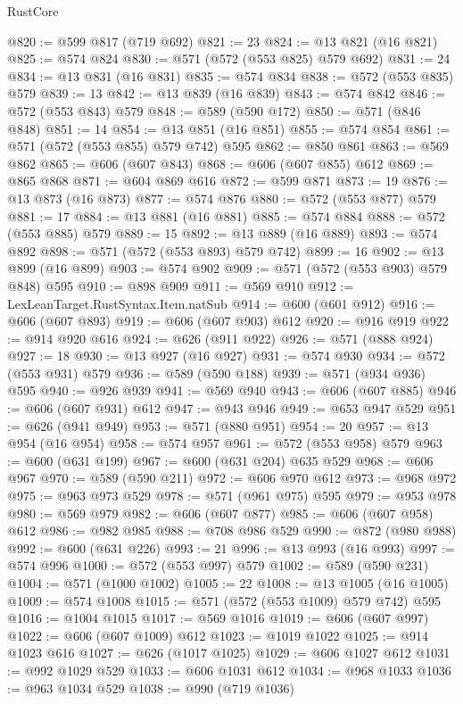 \begin{lexlean}{RustCore}
\begin{coremodule}
@820 := @599 @817 (@719 @692)
@821 := 23
@824 := @13 @821 (@16 @821)
@825 := @574 @824
@830 := @571 (@572 (@553 @825) @579 @692)
@831 := 24
@834 := @13 @831 (@16 @831)
@835 := @574 @834
@838 := @572 (@553 @835) @579
@839 := 13
@842 := @13 @839 (@16 @839)
@843 := @574 @842
@846 := @572 (@553 @843) @579
@848 := @589 (@590 @172)
@850 := @571 (@846 @848)
@851 := 14
@854 := @13 @851 (@16 @851)
@855 := @574 @854
@861 := @571 (@572 (@553 @855) @579 @742) @595
@862 := @850 @861
@863 := @569 @862
@865 := @606 (@607 @843)
@868 := @606 (@607 @855) @612
@869 := @865 @868
@871 := @604 @869 @616
@872 := @599 @871
@873 := 19
@876 := @13 @873 (@16 @873)
@877 := @574 @876
@880 := @572 (@553 @877) @579
@881 := 17
@884 := @13 @881 (@16 @881)
@885 := @574 @884
@888 := @572 (@553 @885) @579
@889 := 15
@892 := @13 @889 (@16 @889)
@893 := @574 @892
@898 := @571 (@572 (@553 @893) @579 @742)
@899 := 16
@902 := @13 @899 (@16 @899)
@903 := @574 @902
@909 := @571 (@572 (@553 @903) @579 @848) @595
@910 := @898 @909
@911 := @569 @910
@912 := LexLeanTarget.RustSyntax.Item.natSub
@914 := @600 (@601 @912)
@916 := @606 (@607 @893)
@919 := @606 (@607 @903) @612
@920 := @916 @919
@922 := @914 @920 @616
@924 := @626 (@911 @922)
@926 := @571 (@888 @924)
@927 := 18
@930 := @13 @927 (@16 @927)
@931 := @574 @930
@934 := @572 (@553 @931) @579
@936 := @589 (@590 @188)
@939 := @571 (@934 @936) @595
@940 := @926 @939
@941 := @569 @940
@943 := @606 (@607 @885)
@946 := @606 (@607 @931) @612
@947 := @943 @946
@949 := @653 @947 @529
@951 := @626 (@941 @949)
@953 := @571 (@880 @951)
@954 := 20
@957 := @13 @954 (@16 @954)
@958 := @574 @957
@961 := @572 (@553 @958) @579
@963 := @600 (@631 @199)
@967 := @600 (@631 @204) @635 @529
@968 := @606 @967
@970 := @589 (@590 @211)
@972 := @606 @970 @612
@973 := @968 @972
@975 := @963 @973 @529
@978 := @571 (@961 @975) @595
@979 := @953 @978
@980 := @569 @979
@982 := @606 (@607 @877)
@985 := @606 (@607 @958) @612
@986 := @982 @985
@988 := @708 @986 @529
@990 := @872 (@980 @988)
@992 := @600 (@631 @226)
@993 := 21
@996 := @13 @993 (@16 @993)
@997 := @574 @996
@1000 := @572 (@553 @997) @579
@1002 := @589 (@590 @231)
@1004 := @571 (@1000 @1002)
@1005 := 22
@1008 := @13 @1005 (@16 @1005)
@1009 := @574 @1008
@1015 := @571 (@572 (@553 @1009) @579 @742) @595
@1016 := @1004 @1015
@1017 := @569 @1016
@1019 := @606 (@607 @997)
@1022 := @606 (@607 @1009) @612
@1023 := @1019 @1022
@1025 := @914 @1023 @616
@1027 := @626 (@1017 @1025)
@1029 := @606 @1027 @612
@1031 := @992 @1029 @529
@1033 := @606 @1031 @612
@1034 := @968 @1033
@1036 := @963 @1034 @529
@1038 := @990 (@719 @1036)

\end{coremodule}
\end{lexlean}
